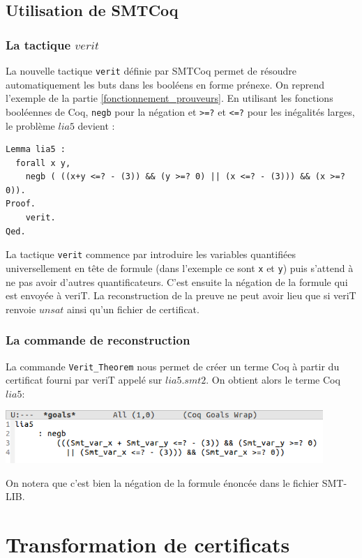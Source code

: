 \documentclass[11pt]{article}
\begin{document}
\subsection{Utilisation de SMTCoq}

\subsubsection{La tactique $verit$}

La nouvelle tactique \texttt{verit} définie par SMTCoq permet de résoudre automatiquement les buts dans les booléens en forme prénexe. On reprend l'exemple de la partie \ref{fonctionnement_prouveurs}. En utilisant les fonctions booléennes de Coq, \texttt{negb} pour la négation et \texttt{>=?} et \texttt{<=?} pour les inégalités larges, le problème $lia5$ devient :

\begin{lstlisting}[frame=single]
Lemma lia5 : 
  forall x y,
    negb ( ((x+y <=? - (3)) && (y >=? 0) || (x <=? - (3))) && (x >=? 0)).
Proof.
    verit.
Qed.
\end{lstlisting}

La tactique \texttt{verit} commence par introduire les variables quantifiées universellement en tête de formule (dans l'exemple ce sont \texttt{x} et \texttt{y}) puis s'attend à ne pas avoir d'autres quantificateurs. C'est ensuite la négation de la formule qui est envoyée à veriT. La reconstruction de la preuve ne peut avoir lieu que si veriT renvoie $unsat$ ainsi qu'un fichier de certificat.

\subsubsection{La commande de reconstruction}

La commande \texttt{Verit\_Theorem} nous permet de créer un terme Coq à partir du certificat fourni par veriT appelé sur $lia5.smt2$. On obtient alors le terme Coq $lia5$:

\includegraphics[height=2cm]{checklia5.png}

On notera que c'est bien la négation de la formule énoncée dans le fichier SMT-LIB. 



\section{Transformation de certificats} \label{transformation_certif}
\end{document}
